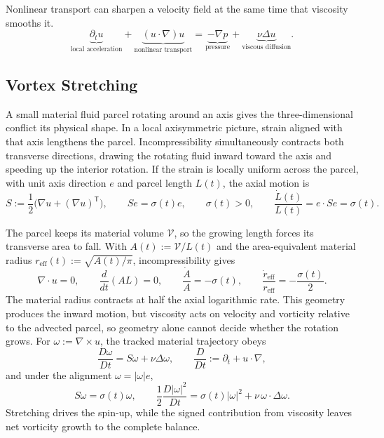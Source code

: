 
Nonlinear transport can sharpen a velocity field at the same time that viscosity smooths it.
\[
  \underbrace{\partial_t u}_{\text{local acceleration}}
  +
  \underbrace{(u\cdot\nabla)u}_{\text{nonlinear transport}}
  =
  \underbrace{-\nabla p}_{\text{pressure}}
  +
  \underbrace{\nu\Delta u}_{\text{viscous diffusion}}.
\]

\subsection{Vortex Stretching}\label{sub:ThePerfectlyStretchingVortex}

A small material fluid parcel rotating around an axis gives the three-dimensional conflict its physical shape. In a local axisymmetric picture, strain aligned with that axis lengthens the parcel. Incompressibility simultaneously contracts both transverse directions, drawing the rotating fluid inward toward the axis and speeding up the interior rotation. If the strain is locally uniform across the parcel, with unit axis direction \(e\) and parcel length \(L(t)\), the axial motion is
\[
  S:=\frac12\bigl(\nabla u+(\nabla u)^{\mathsf T}\bigr),
  \qquad
  Se=\sigma(t)e,
  \qquad
  \sigma(t)>0,
  \qquad
  \frac{\dot L(t)}{L(t)}
  =
  e\cdot Se
  =
  \sigma(t).
\]

The parcel keeps its material volume \(\mathcal V\), so the growing length forces its transverse area to fall. With \(A(t):=\mathcal V/L(t)\) and the area-equivalent material radius \(r_{\mathrm{eff}}(t):=\sqrt{A(t)/\pi}\), incompressibility gives
\[
  \nabla\cdot u=0,
  \qquad
  \frac{d}{dt}(A L)=0,
  \qquad
  \frac{\dot A}{A}=-\sigma(t),
  \qquad
  \frac{\dot r_{\mathrm{eff}}}{r_{\mathrm{eff}}}
  =
  -\frac{\sigma(t)}{2}.
\]
The material radius contracts at half the axial logarithmic rate. This geometry produces the inward motion, but viscosity acts on velocity and vorticity relative to the advected parcel, so geometry alone cannot decide whether the rotation grows. For \(\omega:=\nabla\times u\), the tracked material trajectory obeys
\[
  \frac{D\omega}{Dt}
  =
  S\omega+\nu\Delta\omega,
  \qquad
  \frac{D}{Dt}
  :=
  \partial_t+u\cdot\nabla,
\]
and under the alignment \(\omega=|\omega|e\),
\[
  S\omega
  =
  \sigma(t)\omega,
  \qquad
  \frac12\frac{D|\omega|^2}{Dt}
  =
  \sigma(t)|\omega|^2
  +
  \nu\,\omega\cdot\Delta\omega.
\]
Stretching drives the spin-up, while the signed contribution from viscosity leaves net vorticity growth to the complete balance.

